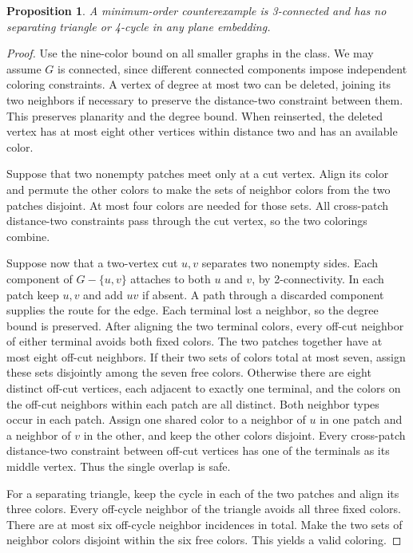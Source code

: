 \documentclass[11pt]{article}
\newtheorem{proposition}{Proposition}
\begin{document}
\begin{proposition}
A minimum-order counterexample is 3-connected and has no
separating triangle or 4-cycle in any plane embedding.
\end{proposition}
\begin{proof}
Use the nine-color bound on all smaller graphs in the class.
We may assume \(G\) is connected, since different connected
components impose independent coloring constraints. A vertex
of degree at most two can be deleted, joining its two neighbors
if necessary to preserve the distance-two constraint between
them. This preserves planarity and the degree bound. When
reinserted, the deleted vertex has at most eight other vertices
within distance two and has an available color.

Suppose that two nonempty patches meet only at a cut vertex.
Align its color and permute the other colors to make the
sets of neighbor colors from the two patches disjoint.
At most four colors are needed for those sets. All cross-patch
distance-two constraints pass through the cut vertex, so
the two colorings combine.

Suppose now that a two-vertex cut \(u,v\) separates two
nonempty sides. Each component of \(G-\{u,v\}\) attaches
to both \(u\) and \(v\), by 2-connectivity. In each patch
keep \(u,v\) and add \(uv\) if absent. A path through a
discarded component supplies the route for the edge. Each
terminal lost a neighbor, so the degree bound is preserved.
After aligning the two terminal colors, every off-cut neighbor
of either terminal avoids both fixed colors.
The two patches together have at most eight off-cut neighbors.
If their two sets of colors total at most seven, assign
these sets disjointly among the seven free colors.
Otherwise there are eight distinct off-cut vertices, each
adjacent to exactly one terminal, and the colors on the
off-cut neighbors within each patch are all distinct.
Both neighbor types occur in each patch. Assign one shared
color to a neighbor of \(u\) in one patch and a neighbor of
\(v\) in the other, and keep the other colors disjoint.
Every cross-patch distance-two constraint between off-cut
vertices has one of the terminals as its middle vertex.
Thus the single overlap is safe.

For a separating triangle, keep the cycle in each of
the two patches and align its three colors. Every off-cycle
neighbor of the triangle avoids all three fixed colors.
There are at most six off-cycle neighbor incidences in total.
Make the two sets of neighbor colors disjoint within the
six free colors. This yields a valid coloring.


\end{proof}
\end{document}
